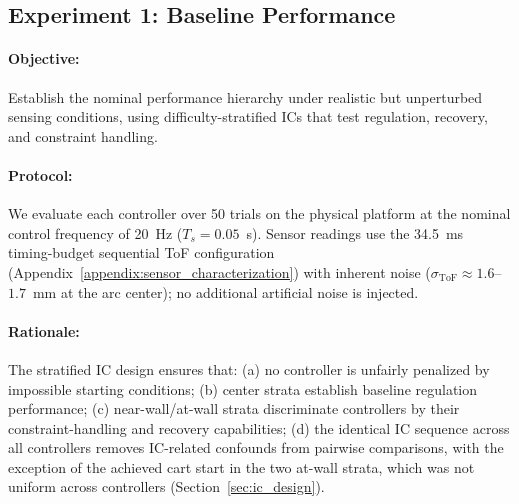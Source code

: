 \subsection{Experiment 1: Baseline Performance}

\paragraph{Objective:}
Establish the nominal performance hierarchy under realistic but
unperturbed sensing conditions, using difficulty-stratified ICs that
test regulation, recovery, and constraint handling.

\paragraph{Protocol:}
We evaluate each controller over 50 trials on the physical
platform at the nominal control frequency of 20~Hz
($T_s = 0.05$~s).
Sensor readings use the 34.5~ms timing-budget sequential ToF
configuration (Appendix~\ref{appendix:sensor_characterization}) with inherent noise
($\sigma_{\text{ToF}} \approx 1.6$--$1.7$~mm at the arc center);
no additional artificial noise is injected.

\paragraph{Rationale:}
The stratified IC design ensures that:
(a) no controller is unfairly penalized by impossible starting
conditions;
(b) center strata establish baseline regulation performance;
(c) near-wall/at-wall strata discriminate controllers by their
constraint-handling and recovery capabilities;
(d) the identical IC sequence across all controllers removes
IC-related confounds from pairwise comparisons, with the exception of
the achieved cart start in the two at-wall strata, which was not uniform
across controllers (Section~\ref{sec:ic_design}).
